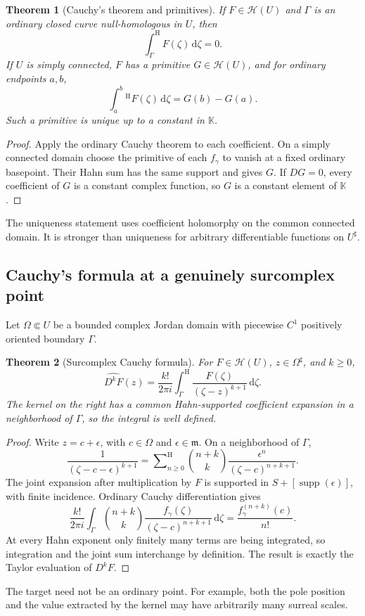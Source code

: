 \documentclass[11pt,oneside]{article}
\newtheorem{theorem}{Theorem}[section]
\theoremstyle{definition}\newtheorem{definition}[theorem]{Definition}
\newcommand{\K}{\mathbb K}
\newcommand{\HH}{\mathcal H}
\newcommand{\mm}{\mathfrak m}
\newcommand{\supp}{\operatorname{supp}}
\newcommand{\dd}{\,\mathrm d}
\newcommand{\Hsum}{\mathop{\sum}\nolimits^{\mathrm H}}
\newcommand{\htop}{\mathrm H}
\begin{document}
\begin{theorem}[Cauchy's theorem and primitives]\label{thm:cauchyth}
If $F\in\HH(U)$ and $\Gamma$ is an ordinary closed curve null-homologous in $U$, then
\[
 \int_\Gamma^{\htop}F(\zeta)\dd\zeta=0.
\]
If $U$ is simply connected, $F$ has a primitive $G\in\HH(U)$, and for ordinary endpoints $a,b$,
\[
 \int_a^b{}^{\htop}F(\zeta)\dd\zeta=G(b)-G(a).
\]
Such a primitive is unique up to a constant in $\K$.
\end{theorem}
\begin{proof}
Apply the ordinary Cauchy theorem to each coefficient. On a simply connected domain choose the primitive of each $f_\gamma$ to vanish at a fixed ordinary basepoint. Their Hahn sum has the same support and gives $G$. If $DG=0$, every coefficient of $G$ is a constant complex function, so $G$ is a constant element of $\K$.
\end{proof}
The uniqueness statement uses coefficient holomorphy on the common connected domain. It is stronger than uniqueness for arbitrary differentiable functions on $U^\sharp$.

\subsection{Cauchy's formula at a genuinely surcomplex point}
Let $\Omega\Subset U$ be a bounded complex Jordan domain with piecewise $C^1$ positively oriented boundary $\Gamma$.

\begin{theorem}[Surcomplex Cauchy formula]\label{thm:cauchyformula}
For $F\in\HH(U)$, $z\in\Omega^\sharp$, and $k\geq0$,
\begin{equation}\label{eq:cauchyformula}
 \widehat{D^kF}(z)
 =\frac{k!}{2\pi i}\int_\Gamma^{\htop}
     \frac{F(\zeta)}{(\zeta-z)^{k+1}}\dd\zeta.
\end{equation}
The kernel on the right has a common Hahn-supported coefficient expansion in a neighborhood of $\Gamma$, so the integral is well defined.
\end{theorem}
\begin{proof}
Write $z=c+\epsilon$, with $c\in\Omega$ and $\epsilon\in\mm$. On a neighborhood of $\Gamma$,
\[
 \frac1{(\zeta-c-\epsilon)^{k+1}}
 =\Hsum_{n\geq0}\binom{n+k}{k}
       \frac{\epsilon^n}{(\zeta-c)^{n+k+1}}.
\]
The joint expansion after multiplication by $F$ is supported in $S+[\supp(\epsilon)]$, with finite incidence. Ordinary Cauchy differentiation gives
\[
 \frac{k!}{2\pi i}\int_\Gamma
  \binom{n+k}{k}\frac{f_\gamma(\zeta)}{(\zeta-c)^{n+k+1}}\dd\zeta
 =\frac{f_\gamma^{(n+k)}(c)}{n!}.
\]
At every Hahn exponent only finitely many terms are being integrated, so integration and the joint sum interchange by definition. The result is exactly the Taylor evaluation of $D^kF$.
\end{proof}
The target need not be an ordinary point. For example, both the pole position and the value extracted by the kernel may have arbitrarily many surreal scales.
\end{document}
